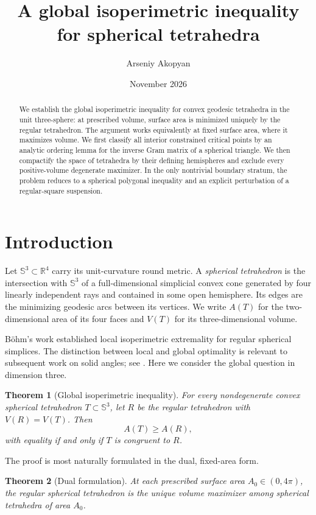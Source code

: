 \documentclass[11pt,reqno]{amsart}
\title[A global inequality for spherical tetrahedra]{A global isoperimetric inequality\\for spherical tetrahedra}
\author{Arseniy Akopyan}
\date{November 2026}
\newtheorem{theorem}{Theorem}[section]
\theoremstyle{remark}
\newcommand{\Sph}{\mathbb S}
\newcommand{\R}{\mathbb R}
\begin{document}
\begin{abstract}
We establish the global isoperimetric inequality for convex geodesic tetrahedra in the unit three-sphere: at prescribed volume, surface area is minimized uniquely by the regular tetrahedron. The argument works equivalently at fixed surface area, where it maximizes volume. We first classify all interior constrained critical points by an analytic ordering lemma for the inverse Gram matrix of a spherical triangle. We then compactify the space of tetrahedra by their defining hemispheres and exclude every positive-volume degenerate maximizer. In the only nontrivial boundary stratum, the problem reduces to a spherical polygonal inequality and an explicit perturbation of a regular-square suspension.
\end{abstract}
\maketitle

\section{Introduction}
Let $\Sph^3\subset\R^4$ carry its unit-curvature round metric. A \emph{spherical tetrahedron} is the intersection with $\Sph^3$ of a full-dimensional simplicial convex cone generated by four linearly independent rays and contained in some open hemisphere. Its edges are the minimizing geodesic arcs between its vertices. We write $A(T)$ for the two-dimensional area of its four faces and $V(T)$ for its three-dimensional volume.

B\"ohm's work \cite{Bohm} established local isoperimetric extremality for regular spherical simplices. The distinction between local and global optimality is relevant to subsequent work on solid angles; see \cite{AkopyanKarasev}. Here we consider the global question in dimension three.

\begin{theorem}[Global isoperimetric inequality]\label{thm:main}
For every nondegenerate convex spherical tetrahedron $T\subset\Sph^3$, let $R$ be the regular tetrahedron with $V(R)=V(T)$. Then
\begin{equation}\label{eq:main}
 A(T)\ge A(R),
\end{equation}
with equality if and only if $T$ is congruent to $R$.
\end{theorem}

The proof is most naturally formulated in the dual, fixed-area form.
\begin{theorem}[Dual formulation]\label{thm:dual}
At each prescribed surface area $A_0\in(0,4\pi)$, the regular spherical tetrahedron is the unique volume maximizer among spherical tetrahedra of area $A_0$.
\end{theorem}
\end{document}
